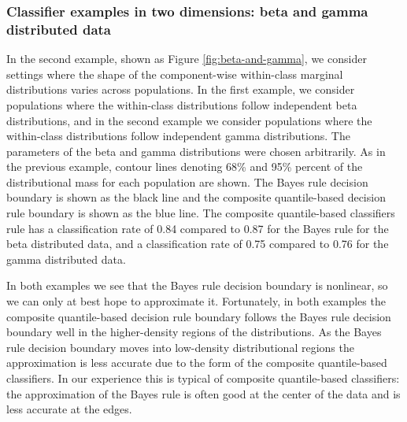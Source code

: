 \subsubsection{Classifier examples in two dimensions: beta and gamma distributed data}
\label{sec:beta-gamma-example}

In the second example, shown as Figure \ref{fig:beta-and-gamma}, we consider
settings where the shape of the component-wise within-class marginal
distributions varies across populations.  In the first example, we consider
populations where the within-class distributions follow independent beta
distributions, and in the second example we consider populations where the
within-class distributions follow independent gamma distributions.  The
parameters of the beta and gamma distributions were chosen arbitrarily.  As in
the previous example, contour lines denoting 68\% and 95\% percent of the
distributional mass for each population are shown.  The Bayes rule decision
boundary is shown as the black line and the composite quantile-based decision
rule boundary is shown as the blue line.  The composite quantile-based
classifiers rule has a classification rate of 0.84 compared to 0.87 for the
Bayes rule for the beta distributed data, and a classification rate of 0.75
compared to 0.76 for the gamma distributed data.

In both examples we see that the Bayes rule decision boundary is nonlinear, so
we can only at best hope to approximate it.  Fortunately, in both examples the
composite quantile-based decision rule boundary follows the Bayes rule decision
boundary well in the higher-density regions of the distributions.  As the Bayes
rule decision boundary moves into low-density distributional regions the
approximation is less accurate due to the form of the composite quantile-based
classifiers.  In our experience this is typical of composite quantile-based
classifiers: the approximation of the Bayes rule is often good at the center of
the data and is less accurate at the edges.

